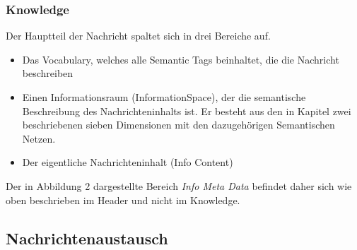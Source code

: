 \subsubsection{Knowledge}
Der Hauptteil der Nachricht spaltet sich in drei Bereiche auf.
\begin{itemize}
	\item Das Vocabulary, welches alle Semantic Tags beinhaltet, die die Nachricht beschreiben
	\item Einen Informationsraum (InformationSpace), der die semantische Beschreibung des Nachrichteninhalts ist. Er besteht aus den in Kapitel zwei beschriebenen sieben Dimensionen mit den dazugehörigen Semantischen Netzen.
	\item Der eigentliche Nachrichteninhalt (Info Content)	
\end{itemize}
Der in Abbildung 2 dargestellte Bereich \textit{Info Meta Data} befindet daher sich wie oben beschrieben im Header und nicht im Knowledge.
\subsection{Nachrichtenaustausch}
